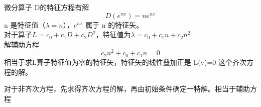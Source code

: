 \begin{frame}	
	微分算子 D的特征方程有解
	\begin{equation*}
		D(e^{nx})=n e^{nx}
	\end{equation*}	
	n 是特征值（$\lambda=n$），$e^{nx}$ 属于 n 的特征矢。\\
	对于算子$L= c_0 + c_1D +c_2D^2 $，特征值为$\lambda=c_0 + c_1n +c_2n^2$ \\
	解辅助方程
	\begin{equation*}
		c_2n^2+c_0 + c_1n =0
	\end{equation*}	
	相当于求L算子特征值为零的特征矢，特征矢的线性叠加正是 L(y)=0 这个齐次方程的解。
\end{frame}

\begin{frame}
	对于非齐次方程，先求得齐次方程的解，再由初始条件确定一特解。相当于辅助方程
\end{frame}

